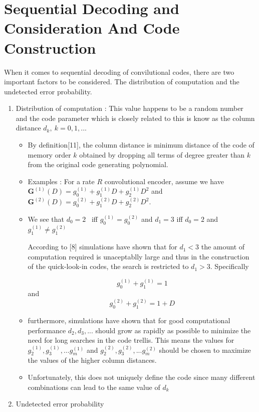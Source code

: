 \documentclass[fontsize=12pt]{article}
\begin{document}
\section{Sequential Decoding and Consideration And Code Construction}
When it comes to sequential decoding of convilutional codes, there are two important factors to be considered. The distribution of computation and the undetected error probability.
\begin{enumerate}
\item Distribution of computation : This value happens to be a random number and the code parameter which is closely related to this is know as the column distance $d_k,~k=0,1,...$

\begin{itemize}
\item By definition[11], the column distance is minimum distance of  the code of memory order $k$ obtained by dropping all terms of degree greater than $k$ from the original code generating polynomial.

\item Examples : For a rate $R$ convolutional encoder, assume we have $\mathbf{G}^{(1)}(D)=g^{(1)}_0 + g^{(1)}_1D+g^{(1)}_2D^2$ and $\mathbf{G}^{(2)}(D)=g^{(2)}_0 + g^{(2)}_1D+g^{(2)}_2D^2$. 

\item We see that $d_0=2$~ iff $g^{(1)}_0=g^{(2)}_0$ and $d_1=3$ iff $d_0 =2$ and $g^{(1)}_1 \neq g^{(2)}_1$

According to [8] simulations have shown that for $d_1<3$ the amount of computation required is unaceptablly large and thus in the construction of the quick-look-in codes, the search is restricted to $d_1>3$. Specifically

$$g^{(1)}_0 + g^{(1)}_1 = 1$$ and $$g^{(2)}_0 + g^{(2)}_1 = 1 + D$$

\item furthermore, simulations have shown that for good computational performance $d_2,d_3,...$ should grow as rapidly as possible to minimize the need for long searches in the code trellis. This means the values for $g^{(1)}_2,g^{(1)}_3,...g^{(1)}_m$ and  $g^{(2)}_2,g^{(2)}_3,...g^{(2)}_m$ should be chosen to maximize the values of the higher column distances.

\item Unfortunately, this does not uniquely define the code since many different combinations can lead to the same value of $d_k$
\end{itemize}
\item Undetected error probability


\end{enumerate}
\end{document}
